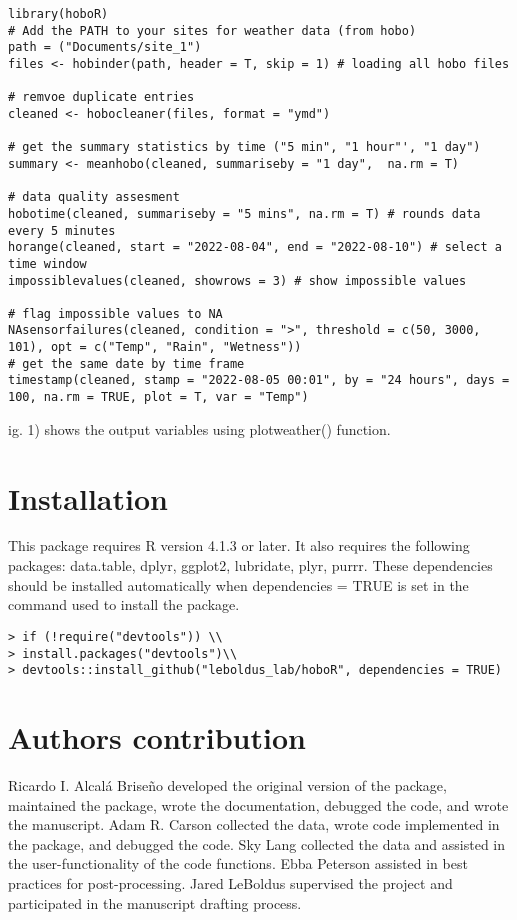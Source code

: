 \documentclass[11pt, oneside]{article}   	%
\begin{document}
\begin{verbatim}
library(hoboR)
# Add the PATH to your sites for weather data (from hobo)
path = ("Documents/site_1")
files <- hobinder(path, header = T, skip = 1) # loading all hobo files
 
# remvoe duplicate entries
cleaned <- hobocleaner(files, format = "ymd")

# get the summary statistics by time ("5 min", "1 hour"', "1 day")
summary <- meanhobo(cleaned, summariseby = "1 day",  na.rm = T) 

# data quality assesment
hobotime(cleaned, summariseby = "5 mins", na.rm = T) # rounds data every 5 minutes 
horange(cleaned, start = "2022-08-04", end = "2022-08-10") # select a time window  
impossiblevalues(cleaned, showrows = 3) # show impossible values

# flag impossible values to NA
NAsensorfailures(cleaned, condition = ">", threshold = c(50, 3000, 101), opt = c("Temp", "Rain", "Wetness"))
# get the same date by time frame
timestamp(cleaned, stamp = "2022-08-05 00:01", by = "24 hours", days = 100, na.rm = TRUE, plot = T, var = "Temp")

\end{verbatim}

\caption Fig. 1) shows the output variables using plotweather() function.

\section*{Installation}
This package requires R version 4.1.3 or later. It also requires the following packages: data.table, dplyr, ggplot2,  lubridate, plyr, purrr. These dependencies should be installed automatically when dependencies = TRUE is set in the command used to install the package.
\begin{verbatim}
> if (!require("devtools")) \\
> install.packages("devtools")\\
> devtools::install_github("leboldus_lab/hoboR", dependencies = TRUE)
\end{verbatim}

 
\section*{Authors contribution}
Ricardo I. Alcal\'a Brise\~no developed the original version of the package, maintained the package, wrote the documentation, debugged the code, and wrote the manuscript. Adam R. Carson collected the data, wrote code implemented in the package, and debugged the code. Sky Lang collected the data and assisted in the user-functionality of the code functions. Ebba Peterson assisted in best practices for post-processing. Jared LeBoldus supervised the project and participated in the manuscript drafting process.
\end{document}
